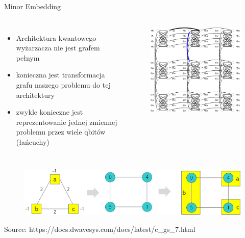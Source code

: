 \begin{frame}{Minor Embedding}
 \begin{columns}[t] %
\begin{itemize}
    \item Architektura kwantowego wyżarzacza nie jest grafem pełnym
    
\item konieczna jest transformacja grafu naszego problemu do tej architektury 
\item  zwykle konieczne jest reprezentowanie jednej zmiennej problemu przez wiele qbitów (łańcuchy)

\end{itemize}
    \begin{figure}[H]
    \centering
    \includegraphics[width=\linewidth]{img/18/chimera.png}
\end{figure}

\end{columns}
 \begin{figure}[H]
    \centering
    \includegraphics[width=0.9\linewidth]{img/18/simple_embed.png}
\end{figure} 
\tiny Source: https://docs.dwavesys.com/docs/latest/c\_gs\_7.html

\end{frame}
